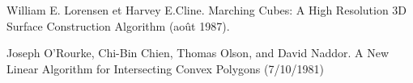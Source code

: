 \documentclass{article}
\begin{document}
\begin{thebibliography}{1}
    William E. Lorensen et Harvey E.Cline. Marching Cubes:
    A High Resolution 3D Surface Construction Algorithm (août 1987).
    
    Joseph O\textquoteright Rourke, Chi-Bin Chien, Thomas
    Olson, and David Naddor. A New Linear Algorithm for Intersecting Convex
    Polygons (7/10/1981)
\end{thebibliography}
\end{document}

